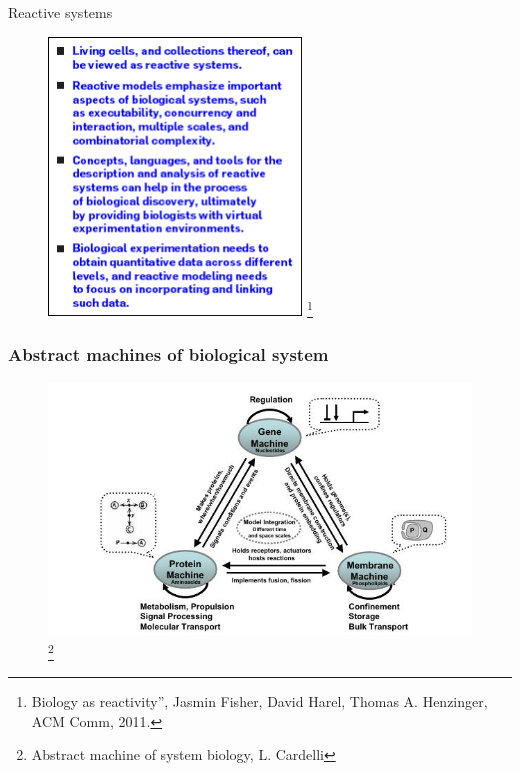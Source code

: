 \documentclass{beamer}
\begin{document}
   \begin{frame}{Reactive systems}
     \begin{figure}
     \centering
     \includegraphics[width=0.6\textwidth]{./figures/bio_as_reactivity.png}
      \footnote{Biology as reactivity”, Jasmin Fisher, David Harel, Thomas A.
      Henzinger, ACM Comm, 2011.}
    \end{figure}
\end{frame}
    
\begin{frame}
 \frametitle{Abstract machines of biological system}
 \begin{figure}
    \includegraphics[width=\textwidth]{./figures/abs_machine.png}
    \footnote{Abstract machine of system biology, L. Cardelli}
  \end{figure}
\end{frame}
\end{document}
